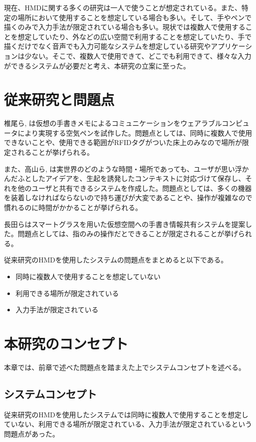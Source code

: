 \documentclass[technicalreport]{ieicej}
\begin{document}
現在、HMDに関する多くの研究は一人で使うことが想定されている。また、特定の場所において使用することを想定している場合も多い。そして、手やペンで描くのみで入力手法が限定されている場合も多い。現状では複数人で使用することを想定していたり、外などの広い空間で利用することを想定していたり、手で描くだけでなく音声でも入力可能なシステムを想定している研究やアプリケーションは少ない。そこで、複数人で使用できて、どこでも利用できて、様々な入力ができるシステムが必要だと考え、本研究の立案に至った。

\section{従来研究と問題点}
椎尾ら\cite{siio}, \cite{siio2}は仮想の手書きメモによるコミュニケーションをウェアラブルコンピュータにより実現する空気ペンを試作した。問題点としては、同時に複数人で使用できないことや、使用できる範囲がRFIDタグがついた床上のみなので場所が限定されることが挙げられる。

また、高山ら\cite{tano}, \cite{tano2}は実世界のどのような時間・場所であっても、ユーザが思い浮かんだふとしたアイデアを、生起を誘発したコンテキストに対応づけて保存し、それを他のユーザと共有できるシステムを作成した。問題点としては、多くの機器を装着しなければならないので持ち運びが大変であることや、操作が複雑なので慣れるのに時間がかかることが挙げられる。

長田ら\cite{nagata}はスマートグラスを用いた仮想空間への手書き情報共有システムを提案した。問題点としては、指のみの操作だとできることが限定されることが挙げられる。

従来研究のHMDを使用したシステムの問題点をまとめると以下である。

\begin{itemize}
 \item 同時に複数人で使用することを想定していない
 \item 利用できる場所が限定されている
 \item 入力手法が限定されている
\end{itemize}

\section{本研究のコンセプト}
本章では、前章で述べた問題点を踏まえた上でシステムコンセプトを述べる。

\subsection{システムコンセプト}
従来研究のHMDを使用したシステムでは同時に複数人で使用することを想定していない、利用できる場所が限定されている、入力手法が限定されているという問題点があった。
\end{document}
